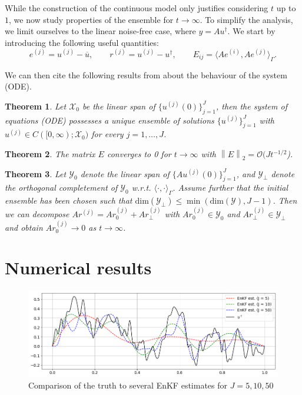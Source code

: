 \documentclass[10pt,a4paper]{article}
\newtheorem{theorem}{Theorem}
\newcommand{\norm}[1]{\left\lVert#1\right\rVert}
\begin{document}
While the construction of the continuous model only justifies considering $t$ up to $1$, we now study properties of the ensemble for $t \rightarrow \infty$.
To simplify the analysis, we limit ourselves to the linear noise-free case, where
$y = Au^\dagger$. We start by introducing the following useful quantities:
\begin{equation*}
    e^{(j)} = u^{(j)} - \overline{u},
    \qquad 
    r^{(j)} = u^{(j)} - u^\dagger,
    \qquad
    E_{ij} = \langle Ae^{(i)}, Ae^{(j)} \rangle_\Gamma.
\end{equation*}

We can then cite the following results from \cite{schillings2017analysis} about the behaviour 
of the system (ODE).

\begin{theorem}
    Let $\mathcal{X}_0$ be the linear span of $\{u^{(j)}(0)\}_{j=1}^J$, then the system of equations
    (ODE) possesses a unique ensemble of solutions $\{u^{(j)}\}_{j=1}^J$ with $u^{(j)} \in C([0, \infty); \mathcal{X}_0)$
    for every $j = 1, \ldots, J$.
\end{theorem}

\begin{theorem}
    The matrix $E$ converges to 0 for $t \rightarrow \infty$ with $\norm{E}_2 = \mathcal{O}(Jt^{-1/2}$).
\end{theorem}

\begin{theorem}
    Let $\mathcal{Y}_0$ denote the linear span of $\{Au^{(j)}(0)\}_{j=1}^J$, and $\mathcal{Y}_\bot$ denote the orthogonal
    completement of $\mathcal{Y}_0$ w.r.t. $\langle \cdot, \cdot \rangle_\Gamma$. Assume further that the initial ensemble
    has been chosen such that $\text{dim}(\mathcal{Y}_\bot) \le \min (\text{dim}(\mathcal{Y}), J-1)$. Then
    we can decompose $Ar^{(j)} = Ar^{(j)}_0 + Ar^{(j)}_\bot$ with $Ar^{(j)}_0 \in \mathcal{Y}_0$ and $Ar^{(j)}_\bot \in \mathcal{Y}_\bot$
    and obtain $Ar^{(j)}_0 \rightarrow 0$ as $t \rightarrow \infty$.

\end{theorem}

\section*{Numerical results}

\begin{figure} \label{fig-1}
    \centering
    \includegraphics[scale=0.35]{multi_plot.png}
    \caption{Comparison of the truth to several EnKF estimates for $J = 5, 10, 50$}
\end{figure}
\end{document}
